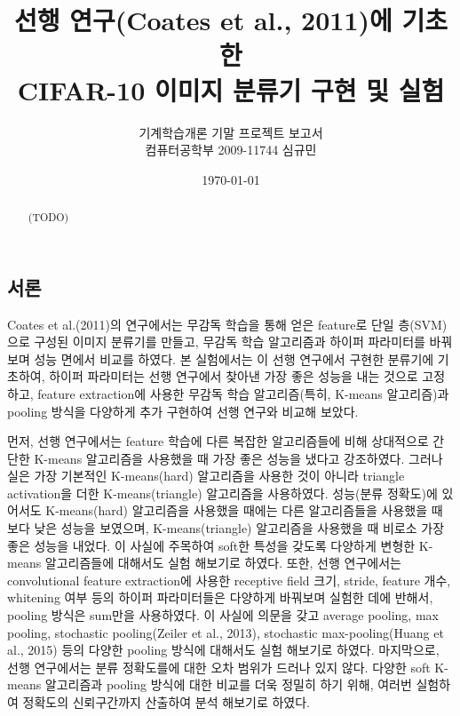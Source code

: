 \documentclass[a4paper,9pt]{article}
\begin{document}
\title{선행 연구(Coates et al., 2011)에 기초한 \\
CIFAR-10 이미지 분류기 구현 및 실험}
\author{기계학습개론 기말 프로젝트 보고서 \\
컴퓨터공학부 2009-11744 심규민}
\date{\koreandate\today}

\maketitle

\begin{abstract}
(TODO)
\end{abstract}

\tableofcontents

\pagebreak

\begin{multicols*}{2}

\section{서론}

Coates et al.(2011)의 연구에서는 무감독 학습을 통해 얻은 feature로 단일 층(SVM)으로 구성된 이미지 분류기를 만들고, 무감독 학습 알고리즘과 하이퍼 파라미터를 바꿔보며 성능 면에서 비교를 하였다.
본 실험에서는 이 선행 연구에서 구현한 분류기에 기초하여, 하이퍼 파라미터는 선행 연구에서 찾아낸 가장 좋은 성능을 내는 것으로 고정하고, feature extraction에 사용한 무감독 학습 알고리즘(특히, K-means 알고리즘)과 pooling 방식을 다양하게 추가 구현하여 선행 연구와 비교해 보았다.

먼저, 선행 연구에서는 feature 학습에 다른 복잡한 알고리즘들에 비해 상대적으로 간단한 K-means 알고리즘을 사용했을 때 가장 좋은 성능을 냈다고 강조하였다.
그러나 실은 가장 기본적인 K-means(hard) 알고리즘을 사용한 것이 아니라 triangle activation을 더한 K-means(triangle) 알고리즘을 사용하였다.
성능(분류 정확도)에 있어서도 K-means(hard) 알고리즘을 사용했을 때에는 다른 알고리즘들을 사용했을 때 보다 낮은 성능을 보였으며, K-means(triangle) 알고리즘을 사용했을 때 비로소 가장 좋은 성능을 내었다.
이 사실에 주목하여 soft한 특성을 갖도록 다양하게 변형한 K-means 알고리즘들에 대해서도 실험 해보기로 하였다.
또한, 선행 연구에서는 convolutional feature extraction에 사용한 receptive field 크기, stride, feature 개수, whitening 여부 등의 하이퍼 파라미터들은 다양하게 바꿔보며 실험한 데에 반해서, pooling 방식은 sum만을 사용하였다.
이 사실에 의문을 갖고 average pooling, max pooling, stochastic pooling(Zeiler et al., 2013), stochastic max-pooling(Huang et al., 2015) 등의 다양한 pooling 방식에 대해서도 실험 해보기로 하였다.
마지막으로, 선행 연구에서는 분류 정확도를에 대한 오차 범위가 드러나 있지 않다.
다양한 soft K-means 알고리즘과 pooling 방식에 대한 비교를 더욱 정밀히 하기 위해, 여러번 실험하여 정확도의 신뢰구간까지 산출하여 분석 해보기로 하였다.


\end{multicols*}
\end{document}
